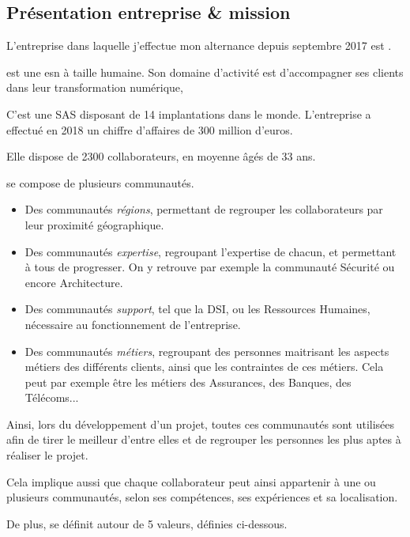 \subsection*{Présentation entreprise \& mission}

L'entreprise dans laquelle j'effectue mon alternance depuis septembre 2017 est \onepoint. 

\xmakefirstuc{\onepoint{}} est une \gls{esn} à taille humaine. Son domaine d'activité est d'accompagner ses clients dans leur transformation numérique, 

C'est une \gls{SAS} disposant de 14 implantations dans le monde. L'entreprise a effectué en 2018 un chiffre d'affaires de 300 million d'euros.

Elle dispose de 2300 collaborateurs, en moyenne âgés de 33 ans.

\xmakefirstuc{\onepoint{}} se compose de plusieurs communautés.

\begin{itemize}
	\item Des communautés \emph{régions}, permettant de regrouper les collaborateurs par leur proximité géographique.
	\item Des communautés \emph{expertise}, regroupant l'expertise de chacun, et permettant à tous de progresser. On y retrouve par exemple la communauté Sécurité ou encore Architecture.
	\item Des communautés \emph{support}, tel que la \gls{DSI}, ou les Ressources Humaines, nécessaire au fonctionnement de l'entreprise.
	\item Des communautés \emph{métiers}, regroupant des personnes maitrisant les aspects métiers des différents clients, ainsi que les contraintes de ces métiers. Cela peut par exemple être les métiers des Assurances, des Banques, des Télécoms... 
\end{itemize}

Ainsi, lors du développement d'un projet, toutes ces communautés sont utilisées afin de tirer le meilleur d'entre elles et de regrouper les personnes les plus aptes à réaliser le projet.

Cela implique aussi que chaque collaborateur peut ainsi appartenir à une ou plusieurs communautés, selon ses compétences, ses expériences et sa localisation.

De plus, \onepoint{} se définit autour de 5 valeurs, définies ci-dessous.

